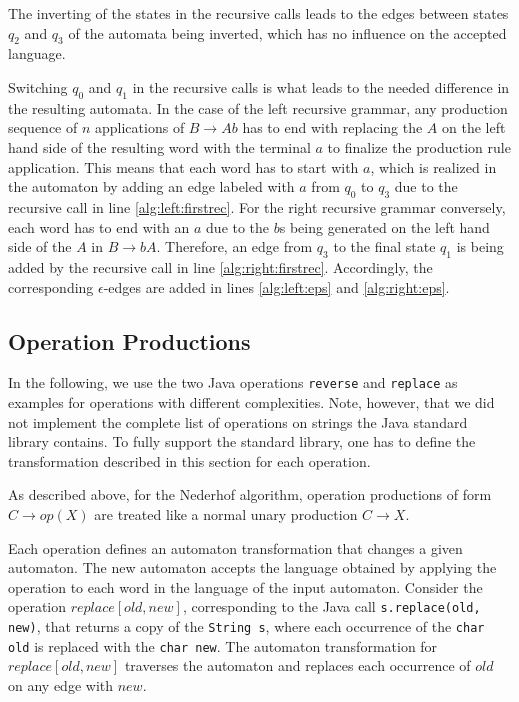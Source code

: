 The inverting of the states in the recursive calls leads to the edges between states $q_2$ and $q_3$ of the automata being inverted, which has no influence on the accepted language. 

Switching $q_0$ and $q_1$ in the recursive calls is what leads to the needed difference in the resulting automata. In the case of the left recursive grammar, any production sequence of $n$ applications of $B \rightarrow Ab$ has to end with replacing the $A$ on the left hand side of the resulting word with the terminal $a$ to finalize the production rule application. This means that each word has to start with $a$, which is realized in the automaton by adding an edge labeled with $a$ from $q_0$ to $q_3$ due to the recursive call in line \ref{alg:left:firstrec}. For the right recursive grammar conversely, each word has to end with an $a$ due to the $b$s being generated on the left hand side of the $A$ in $B \rightarrow bA$. Therefore, an edge from $q_3$ to the final state $q_1$ is being added by the recursive call in line \ref{alg:right:firstrec}.
Accordingly, the corresponding $\epsilon$-edges are added in lines \ref{alg:left:eps} and \ref{alg:right:eps}.

\subsection{Operation Productions}\label{sec:opProduction}

In the following, we use the two Java operations \lstinline|reverse| and \lstinline|replace| as examples for operations with different complexities. Note, however, that we did not implement the complete list of operations on strings the Java standard library contains. To fully support the standard library, one has to define the transformation described in this section for each operation. 

As described above, for the Nederhof algorithm, operation productions of form $C \rightarrow op(X)$ are treated like a normal unary production $C \rightarrow X$.

Each operation defines an automaton transformation that changes a given automaton.
The new automaton accepts the language obtained by applying the operation to each word in the language of the input automaton.
Consider the operation $replace[old, new]$, corresponding to the Java call \lstinline|s.replace(old, new)|, that returns a copy of the \lstinline|String s|, where each occurrence of the \lstinline|char old| is replaced with the \lstinline|char new|.
The automaton transformation for $replace[old, new]$ traverses the automaton and replaces each occurrence of $old$ on any edge with $new$.

